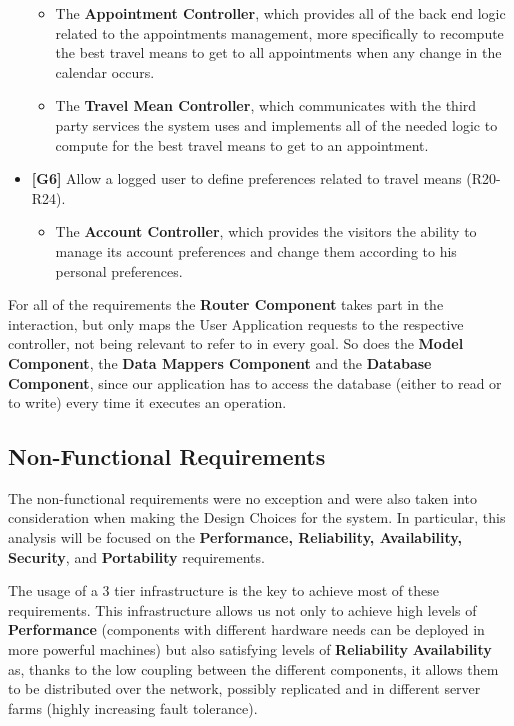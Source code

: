 \documentclass[12pt]{article}
\begin{document}
\begin{itemize}
\begin{itemize}
        \item The \textbf{Appointment Controller}, which provides all of the back end logic related to the appointments management, more specifically to recompute the best travel means to get to all appointments when any change in the calendar occurs.
        \item The \textbf{Travel Mean Controller}, which communicates with the third party services the system uses and implements all of the needed logic to compute for the best travel means to get to an appointment.
    \end{itemize}
    \item \textbf{{[G6]}} Allow a logged user to define preferences related to travel means (R20-R24).
    \begin{itemize}
        \item The \textbf{Account Controller}, which provides the visitors the ability to manage its account preferences and change them according to his personal preferences.
    \end{itemize}
\end{itemize}
For all of the requirements the \textbf{Router Component} takes part in the interaction, but only maps the User Application requests to the respective controller, not being relevant to refer to in every goal. So does the \textbf{Model Component}, the \textbf{Data Mappers Component} and the \textbf{Database Component}, since our application has to access the database (either to read or to write) every time it executes an operation.

\subsection{Non-Functional Requirements}

The non-functional requirements were no exception and were also taken into consideration when making the Design Choices for the system. In particular, this analysis will be focused on the \textbf{Performance, Reliability, Availability, Security}, and \textbf{Portability} requirements.

The usage of a 3 tier infrastructure is the key to achieve most of these requirements. This infrastructure allows us not only to achieve high levels of \textbf{Performance} (components with different hardware needs can be deployed in more powerful machines) but also satisfying levels of \textbf{Reliability} \textbf{Availability} as, thanks to the low coupling between the different components, it allows them to be distributed over the network, possibly replicated and in different server farms (highly increasing fault tolerance).
\end{document}

